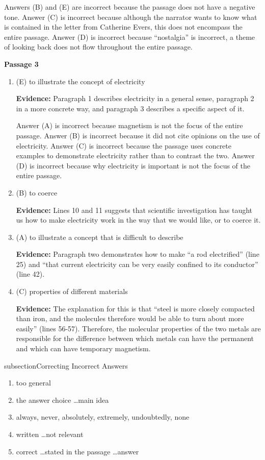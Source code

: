 \begin{enumerate}
\begin{enumerate}
Answers (B) and (E) are incorrect because the passage does not have a negative tone. Answer (C) is incorrect because although the narrator wants to know what is contained in the letter from Catherine Evers, this does not encompass the entire passage. Answer  (D) is incorrect because ``nostalgia'' is incorrect, a theme of looking back does not flow throughout the entire passage.
\end{enumerate}

\textbf{Passage 3}
\begin{enumerate}
\item (E) to illustrate the concept of electricity

\bigskip
\textbf{Evidence:} Paragraph 1 describes electricity in a general sense, paragraph 2 in a more concrete way, and paragraph 3 describes a specific aspect of it. 

Answer (A) is incorrect because magnetism is not the focus of the entire passage. Answer (B) is incorrect because it did not cite opinions on the use of electricity. Answer (C) is incorrect because the passage uses concrete examples to demonstrate electricity rather than to contrast the two. Answer (D) is incorrect because why electricity is important is not the focus of the entire passage.
\item (B) to coerce

\bigskip
\textbf{Evidence:} Lines 10 and 11 suggests that scientific investigation has taught us how to make electricity work in the way that we would like, or to coerce it. 
\item (A) to illustrate a concept that is difficult to describe

\bigskip
\textbf{Evidence:} Paragraph two demonstrates how to make ``a rod electrified'' (line 25) and ``that current electricity can be very easily confined to its conductor'' (line 42). 
\item (C) properties of different materials

\bigskip
\textbf{Evidence:} The explanation for this is that ``steel is more closely compacted than iron, and the molecules therefore would be able to turn about more easily'' (lines 56-57). Therefore, the molecular properties of the two metals are responsible for the difference between which metals can have the permanent and which can have temporary magnetism. 
\end{enumerate}

subsection{Correcting Incorrect Answers}
\begin{enumerate}
\item too general
\item the answer choice \ldots main idea
\item always, never, absolutely, extremely, undoubtedly, none
\item written \ldots not relevant
\item correct \ldots stated in the passage \ldots answer
\end{enumerate}

\end{enumerate}
